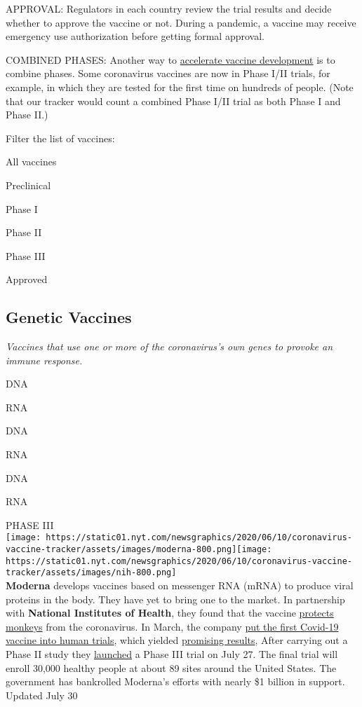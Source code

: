APPROVAL: Regulators in each country review the trial results and decide
whether to approve the vaccine or not. During a pandemic, a vaccine may
receive emergency use authorization before getting formal approval.

COMBINED PHASES: Another way to
\href{https://www.nytimes.com/interactive/2020/04/30/opinion/coronavirus-covid-vaccine.html}{accelerate
vaccine development} is to combine phases. Some coronavirus vaccines are
now in Phase I/II trials, for example, in which they are tested for the
first time on hundreds of people. (Note that our tracker would count a
combined Phase I/II trial as both Phase I and Phase II.)

Filter the list of vaccines:

All vaccines

Preclinical

Phase I

Phase II

Phase III

Approved

\hypertarget{genetic-vaccines}{%
\subsection{\texorpdfstring{\textbf{Genetic
Vaccines}}{Genetic Vaccines}}\label{genetic-vaccines}}

\emph{Vaccines that use one or more of the coronavirus's own genes to
provoke an immune response.}

DNA

RNA

DNA

RNA

DNA

RNA

PHASE III\\
\texttt{[image: https://static01.nyt.com/newsgraphics/2020/06/10/coronavirus-vaccine-tracker/assets/images/moderna-800.png]}\texttt{[image: https://static01.nyt.com/newsgraphics/2020/06/10/coronavirus-vaccine-tracker/assets/images/nih-800.png]}\\
\textbf{Moderna} develops vaccines based on messenger RNA (mRNA) to
produce viral proteins in the body. They have yet to bring one to the
market. In partnership with \textbf{National Institutes of Health}, they
found that the vaccine
\href{https://www.nytimes.com/2020/07/28/health/coronavirus-moderna-vaccine-monkeys.html}{protects
monkeys} from the coronavirus. In March, the company
\href{https://www.nytimes.com/2020/03/16/health/coronavirus-vaccine.html}{put
the first Covid-19 vaccine into human trials}, which yielded
\href{https://www.nytimes.com/2020/07/14/world/coronavirus-update.html\#link-751c8321}{promising
results}, After carrying out a Phase II study they
\href{https://www.nytimes.com/2020/07/27/world/coronavirus-covid-19.html\#link-6509720d}{launched}
a Phase III trial on July 27. The final trial will enroll 30,000 healthy
people at about 89 sites around the United States. The government has
bankrolled Moderna's efforts with nearly \$1 billion in support.\\
Updated July 30

